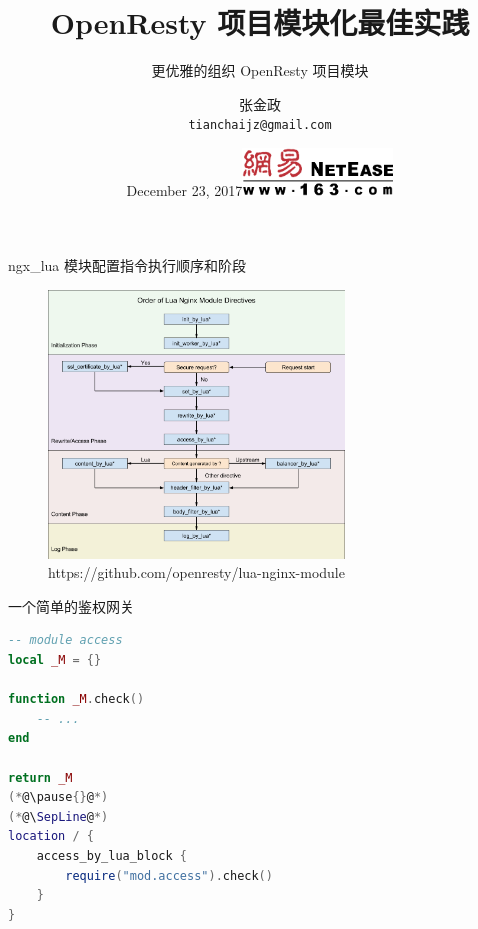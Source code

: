 \documentclass[aspectratio=32]{beamer}
\begin{document}
\title   {OpenResty 项目模块化最佳实践}
\subtitle{更优雅的组织 OpenResty 项目模块}
\author  {张金政 \\ \texttt{tianchaijz@gmail.com}}
\date    {December 23, 2017\hfill\includegraphics[width=0.3\textwidth]{netease}}
\maketitle

\begin{frame}[standout]
\end{frame}

\begin{frame}{ngx\_lua 模块配置指令执行顺序和阶段}
\begin{center}
  \begin{figure}[htlp]
    \includegraphics[width=0.7\textwidth, height=0.8\textheight]{order.png}
    \captionsetup{labelformat=empty}
    \caption{https://github.com/openresty/lua-nginx-module}
  \end{figure}
\end{center}
\end{frame}

\begin{frame}[fragile]{一个简单的鉴权网关}
\small
\begin{lstlisting}[language=lua]
-- module access
local _M = {}

function _M.check()
    -- ...
end

return _M
(*@\pause{}@*)
(*@\SepLine@*)
location / {
    access_by_lua_block {
        require("mod.access").check()
    }
}
\end{lstlisting}
\end{frame}
\end{document}
